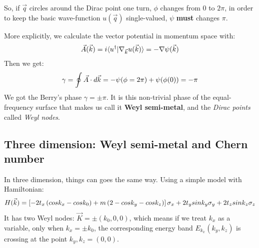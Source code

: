 \documentclass[letterpaper,10pt,english]{sphinxmanual}
\begin{document}
So, if \(\vec{q}\) circles around the Dirac point one turn, \(\phi\) changes from 0 to \(2\pi\), in order to keep the basic wave-function \(u(\vec{q})\) single-valued, \(\psi\) \textbf{must} changes \(\pi\).

More explicitly, we calculate the vector potential in momentum space with:
\begin{gather}
\begin{split}\vec{A}(\vec{k})=i\langle u^\dagger |\nabla_{\vec{k}} u(\vec{k})\rangle=-\nabla \psi(\vec{k})\end{split}\notag
\end{gather}
Then we get:
\begin{gather}
\begin{split}\gamma=\oint{\vec{A}\cdot d\vec{k}} =-\psi(\phi=2\pi)+\psi(\phi(0))=-\pi\end{split}\notag
\end{gather}
We got the Berry's phase \(\gamma=\pm\pi\). It is this non-trivial phase of the equal-frequency surface that makes us call it \textbf{Weyl semi-metal}, and the \emph{Dirac points} called \emph{Weyl nodes}.


\subsection{Three dimension: Weyl semi-metal and Chern number}
\label{TI/Weyl_semi-metal:three-dimension-weyl-semi-metal-and-chern-number}
In three dimension, things can goes the same way. Using a simple model with Hamiltonian:
\begin{gather}
\begin{split}H(\vec{k})=\left[-2t_x\left(cosk_x-cosk_0\right)+m\left(2-cosk_y-cosk_z\right)\right]\sigma_x+2t_ysink_y\sigma_y+2t_zsink_z\sigma_z\end{split}\notag
\end{gather}
It has two Weyl nodes: \(\vec{K}=\pm\left(k_0,0,0\right)\), which means if we treat \(k_x\) as a variable, only when \(k_x=\pm k_0\), the corresponding energy band \(E_{k_x}(k_y,k_z)\) is crossing at the point \(k_y,k_z=(0,0)\).
\end{document}
